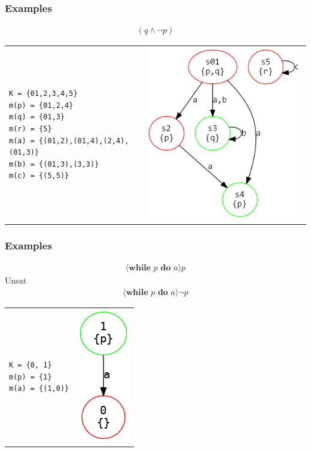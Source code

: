 \documentclass{beamer}
\begin{document}
\begin{frame}[fragile]
\frametitle{Examples}
\small
\begin{align*}
[((a \cup b) \cup c)](q \wedge \neg p)
\end{align*}
\begin{tabular}{ll} 
\begin{lstlisting} 
K = {01,2,3,4,5}
m(p) = {01,2,4}
m(q) = {01,3}
m(r) = {5}
m(a) = {(01,2),(01,4),(2,4),(01,3)}
m(b) = {(01,3),(3,3)}
m(c) = {(5,5)}
\end{lstlisting} &
\includegraphics[scale=0.3]{example2.png}
\end{tabular}
\end{frame}

\begin{frame}[fragile]
\frametitle{Examples}
\small
\begin{align*}
\langle \textbf{while } p\textbf{ do }a \rangle p
\end{align*}
Unsat
\begin{align*}
\langle \textbf{while } p\textbf{ do }a \rangle \neg p
\end{align*}
\begin{tabular}{ll} 
\begin{lstlisting} 
K = {0, 1}
m(p) = {1}
m(a) = {(1,0)}
\end{lstlisting} &
\includegraphics[scale=0.3]{while.png}
\end{tabular}
\end{frame}
\end{document}
